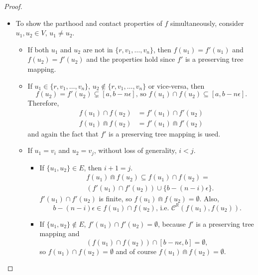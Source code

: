 \documentclass{article}
\newcommand{\R}{\mathbb{R}}
\newcommand{\bcap}{\Cap}
\newcommand{\bcont}{\mathcal{C}^\R}
\begin{document}
\begin{proof}
  \begin{itemize}
  \item To show the parthood and contact properties of $f$ simultaneously, consider $u_1, u_2 \in V$, $u_1 \neq u_2$.
    \begin{itemize}
    \item If both $u_1$ and $u_2$ are not in $\{r, v_1, \dots, v_n\}$, then $f(u_1) = f'(u_1)$ and $f(u_2) = f'(u_2)$ and the properties hold since $f'$ is a preserving tree mapping.
    \item If $u_1 \in \{r, v_1, \dots, v_n\}$, $u_2 \not\in \{r, v_1, \dots, v_n\}$ or vice-versa, then
      \begin{equation*}
        f(u_2) = f'(u_2) \subsetneq [a, b - n\epsilon] \text{, so } f(u_1) \cap f(u_2) \subseteq [a, b - n\epsilon].
      \end{equation*}
      Therefore,
      \begin{align*}
        f(u_1) \cap f(u_2) &= f'(u_1) \cap f'(u_2) \\
        f(u_1) \bcap f(u_2) &= f'(u_1) \bcap f'(u_2)
      \end{align*}
      and again the fact that $f'$ is a preserving tree mapping is used.
    \item If $u_1 = v_i$ and $u_2 = v_j$, without loss of generality, $i < j$.
      \begin{itemize}
      \item If $\{u_1, u_2\} \in E$, then $i + 1 = j$.
        \begin{align*}
          &f(u_1) \bcap f(u_2) \subseteq f(u_1) \cap f(u_2) = \\
          &(f'(u_1) \cap f'(u_2)) \cup \{b - (n - i)\epsilon\}.
        \end{align*}
        $f'(u_1) \cap f'(u_2)$ is finite, so $f(u_1) \bcap f(u_2) = \emptyset$. Also,
        \begin{equation*}
          b - (n - i)\epsilon \in f(u_1) \cap f(u_2) \text{, i.e. } \bcont(f(u_1), f(u_2)).
        \end{equation*}
      \item If $\{u_1, u_2\} \not\in E$, $f'(u_1) \cap f'(u_2) = \emptyset$, because $f'$ is a preserving tree mapping and
        \begin{equation*}
          (f(u_1) \cap f(u_2)) \cap [b - n\epsilon, b] = \emptyset,
        \end{equation*}
        so $f(u_1) \cap f(u_2) = \emptyset$ and of course $f(u_1) \bcap f(u_2) = \emptyset$.
      \end{itemize}

\end{itemize}
\end{itemize}
\end{proof}
\end{document}
